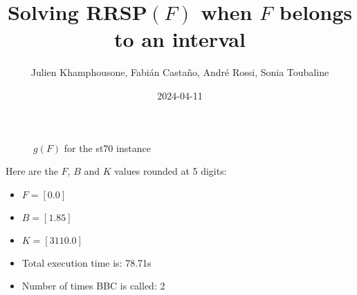 \documentclass{article}
\begin{document}
     \title{Solving RRSP$(F)$ when $F$ belongs to an interval}
     \author{Julien Khamphousone, Fabi\'an Casta\~no, Andr\'e Rossi, Sonia Toubaline}
     \date{2024-04-11}
     \maketitle
     \def\F{{0.0,0.0}}
\def\gF{{31.1,3110.0}}
\begin{figure}[ht!]
    \begin{center}
    \end{center}
    \vspace*{-2eM}
    \caption{$g(F)$ for the st70 instance}\label{fig:1}
    \end{figure}
    Here are the $F$, $B$ and $K$ values rounded at 5 digits:

\begin{itemize}
	\item  $F = [0.0]$
 \item $B = [1.85]$
 \item  $K = [3110.0]$\item Total execution time is: 78.71s\item Number of times BBC is called: 2\end{itemize}
\end{document}
